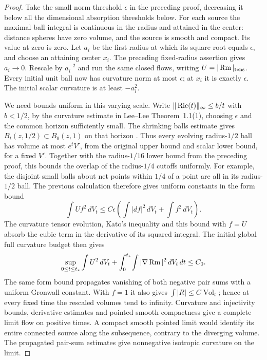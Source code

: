 \begin{proof}
Take the small norm threshold \(\epsilon\) in the preceding proof,
decreasing it below all the dimensional absorption thresholds below.
For each source the maximal ball integral is continuous in the radius
and attained in the center: distance spheres have zero volume, and
the source is smooth and compact. Its value at zero is zero. Let
\(a_i\) be the first radius at which its square root equals
\(\epsilon\), and choose an attaining center \(x_i\). The preceding
fixed-radius assertion gives \(a_i\to0\). Rescale by \(a_i^{-2}\)
and run the same closed flows, writing \(U=|\operatorname{Rm}|_{\rm tens}\).
Every initial unit ball now has curvature norm at most \(\epsilon\);
at \(x_i\) it is exactly \(\epsilon\).
The initial scalar curvature is at least \(-a_i^2\).

We need bounds uniform in this varying scale. Write
\(\|\operatorname{Ric}(t)\|_\infty\le b/t\) with \(b<1/2\), by the
curvature estimate in Lee--Lee Theorem~1.1(1), choosing \(\epsilon\)
and the common horizon sufficiently small. The shrinking balls
estimate gives \(B_t(z,1/2)\subset B_0(z,1)\) on that horizon
\cite[Lemma~3.2]{LeeLee2026Local}. Thus every evolving radius-\(1/2\)
ball has volume at most \(e^{t}V'\), from the original upper bound
and scalar lower bound, for a fixed \(V'\). Together with the
radius-\(1/16\) lower bound from the preceding proof, this bounds
the overlap of the radius-\(1/4\) cutoffs uniformly. For example,
the disjoint small balls about net points within \(1/4\) of a
point are all in its radius-\(1/2\) ball. The previous calculation
therefore gives uniform constants in the form bound
\[
 \int U f^2\,dV_t\le C\epsilon\!
       \left(\int |df|^2\,dV_t+\int f^2\,dV_t\right).
\]
The curvature tensor evolution, Kato's inequality and this bound
with \(f=U\) absorb the cubic term in the derivative of its
squared integral. The initial global full curvature budget then gives
\[
 \sup_{0\le t\le t_*}\int U^2\,dV_t+
 \int_0^{t_*}\!\int |\nabla\operatorname{Rm}|^2\,dV_t\,dt\le C_0 .
\]
The same form bound propagates vanishing of both negative pair sums
with a uniform Gronwall constant. With \(f=1\) it also gives
\(\int |R|\le C\operatorname{Vol}_t\); hence at every fixed time
the rescaled volumes tend to infinity. Curvature and injectivity
bounds, derivative estimates and pointed smooth compactness give
a complete limit flow on positive times. A compact smooth pointed
limit would identify its entire connected source along the
subsequence, contrary to the diverging volume. The propagated
pair-sum estimates give nonnegative isotropic curvature on the limit.


\end{proof}
